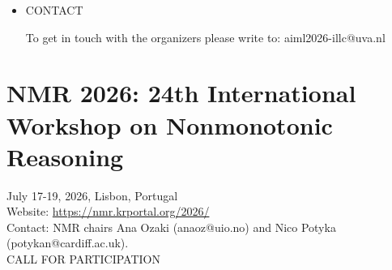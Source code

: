 \documentclass[prodmode,acmtecs]{acmsmall} %
\begin{document}
\begin{itemize}
\begin{itemize}\item  Marta Bílková (The Czech Academy of Sciences)
\item  Yanjing Wang (Peking University)
\end{itemize} 
\item  CONTACT 
 
  To get in touch with the organizers please write to: aiml2026-illc@uva.nl 
 
\end{itemize}\section{NMR 2026: 24th International Workshop on Nonmonotonic Reasoning}\label{NMR2026}  July 17-19, 2026, Lisbon, Portugal\\ 
  Website: \href{https://nmr.krportal.org/2026/}{https://nmr.krportal.org/2026/}\\ 
  Contact: NMR chairs Ana Ozaki (anaoz@uio.no) and Nico Potyka (potykan@cardiff.ac.uk).\\ 
CALL FOR PARTICIPATION 
\end{document}
